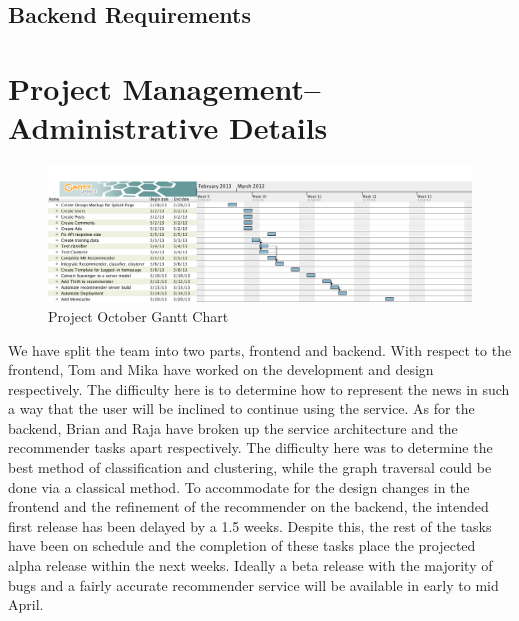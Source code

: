 \documentclass[11pt,letterpaper]{article}
\begin{document}
\subsection{Backend Requirements} %

\section{Project Management--Administrative Details}

\begin{figure}
\centering
\includegraphics[scale=0.35]{img/octoborg-gantt.png}
\caption{Project October Gantt Chart}
\label{fig:gantt}
\end{figure}

We have split the team into two parts, frontend and backend. With respect to the frontend, Tom and Mika have worked on the development and design respectively. The difficulty here is to determine how to represent the news in such a way that the user will be inclined to continue using the service. As for the backend, Brian and Raja have broken up the service architecture and the recommender tasks apart respectively. The difficulty here was to determine the best method of classification and clustering, while the graph traversal could be done via a classical method. To accommodate for the design changes in the frontend and the refinement of the recommender on the backend, the intended first release has been delayed by a 1.5 weeks. Despite this, the rest of the tasks have been on schedule and the completion of these tasks place the projected alpha release within the next weeks. Ideally a beta release with the majority of bugs and a fairly accurate recommender service will be available in early to mid April.
\end{document}
